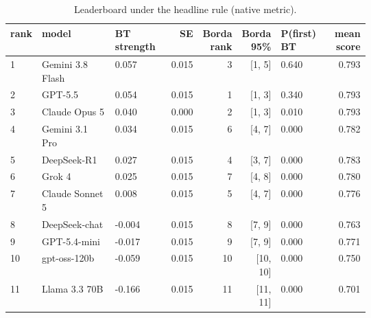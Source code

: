 \begin{table}[htbp]
\centering\tiny
\caption{Leaderboard under the headline rule (native metric).}
\label{tab:leaderboard_headline}
\setlength{\tabcolsep}{3pt}
\begin{tabular}{lp{0.256\linewidth}p{0.176\linewidth}rrrp{0.176\linewidth}r}
\toprule
rank & model & BT strength & SE & Borda rank & Borda 95\% & P(first) BT & mean score \\
\midrule
1 & Gemini 3.8 Flash & 0.057 & 0.015 & 3 & [1, 5] & 0.640 & 0.793 \\
2 & GPT-5.5 & 0.054 & 0.015 & 1 & [1, 3] & 0.340 & 0.793 \\
3 & Claude Opus 5 & 0.040 & 0.000 & 2 & [1, 3] & 0.010 & 0.793 \\
4 & Gemini 3.1 Pro & 0.034 & 0.015 & 6 & [4, 7] & 0.000 & 0.782 \\
5 & DeepSeek-R1 & 0.027 & 0.015 & 4 & [3, 7] & 0.000 & 0.783 \\
6 & Grok 4 & 0.025 & 0.015 & 7 & [4, 8] & 0.000 & 0.780 \\
7 & Claude Sonnet 5 & 0.008 & 0.015 & 5 & [4, 7] & 0.000 & 0.776 \\
8 & DeepSeek-chat & -0.004 & 0.015 & 8 & [7, 9] & 0.000 & 0.763 \\
9 & GPT-5.4-mini & -0.017 & 0.015 & 9 & [7, 9] & 0.000 & 0.771 \\
10 & gpt-oss-120b & -0.059 & 0.015 & 10 & [10, 10] & 0.000 & 0.750 \\
11 & Llama 3.3 70B & -0.166 & 0.015 & 11 & [11, 11] & 0.000 & 0.701 \\
\bottomrule
\end{tabular}
\end{table}
